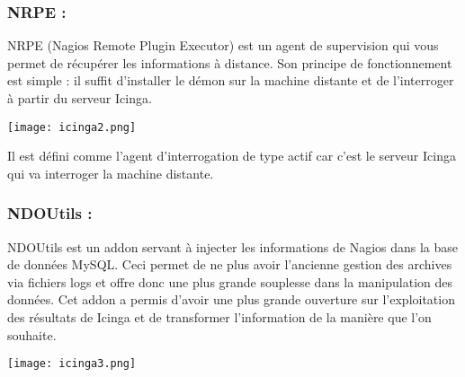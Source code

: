 			\subsubsection{NRPE :}
				\vspace{0.3cm}
		
				NRPE (Nagios Remote Plugin Executor) est un agent de supervision qui vous permet de récupérer les informations à distance. Son principe de fonctionnement est simple : il suffit d’installer le démon sur la machine distante et de l’interroger à partir du serveur Icinga.\\
		
				\begin{center}
					\texttt{[image: icinga2.png]} 
				\end{center}
		
					Il est défini comme l’agent d’interrogation de type actif car c’est le serveur Icinga qui va interroger la machine distante.
		
			\subsubsection{NDOUtils :}
				\vspace{0.3cm}
		
				NDOUtils est un addon servant à injecter les informations de Nagios dans la base de données MySQL. Ceci permet de ne plus avoir l’ancienne gestion des archives via fichiers logs et offre donc une plus grande souplesse dans la manipulation des données. Cet addon a permis d’avoir une plus grande ouverture sur l’exploitation des résultats de Icinga et de transformer l’information de la manière que l’on souhaite.	\\
			
				\begin{center}
					\texttt{[image: icinga3.png]} 
				\end{center}
		
